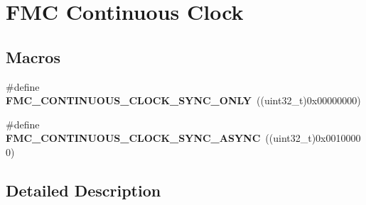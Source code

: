 \hypertarget{group___f_m_c___continous___clock}{}\section{F\+MC Continuous Clock}
\label{group___f_m_c___continous___clock}
\subsection*{Macros}
\begin{DoxyCompactItemize}
\item 
\#define {\bfseries F\+M\+C\+\_\+\+C\+O\+N\+T\+I\+N\+U\+O\+U\+S\+\_\+\+C\+L\+O\+C\+K\+\_\+\+S\+Y\+N\+C\+\_\+\+O\+N\+LY}~((uint32\+\_\+t)0x00000000)\hypertarget{group___f_m_c___continous___clock_ga8d5f2f11df52b83013b7a49703ce9ebf}{}\label{group___f_m_c___continous___clock_ga8d5f2f11df52b83013b7a49703ce9ebf}

\item 
\#define {\bfseries F\+M\+C\+\_\+\+C\+O\+N\+T\+I\+N\+U\+O\+U\+S\+\_\+\+C\+L\+O\+C\+K\+\_\+\+S\+Y\+N\+C\+\_\+\+A\+S\+Y\+NC}~((uint32\+\_\+t)0x00100000)\hypertarget{group___f_m_c___continous___clock_gaa8893acc7cf9c703518f8182926679ed}{}\label{group___f_m_c___continous___clock_gaa8893acc7cf9c703518f8182926679ed}

\end{DoxyCompactItemize}


\subsection{Detailed Description}

